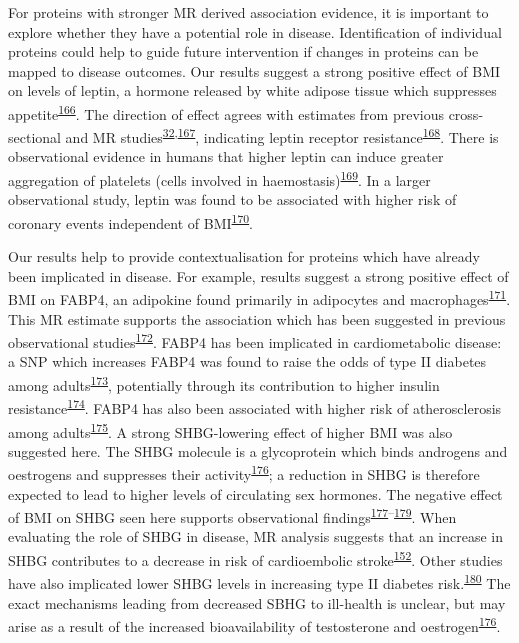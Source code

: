 \documentclass[11pt,twoside]{bristolthesis}
\begin{document}
For proteins with stronger MR derived association evidence, it is important to explore whether they have a potential role in disease. Identification of individual proteins could help to guide future intervention if changes in proteins can be mapped to disease outcomes. Our results suggest a strong positive effect of BMI on levels of leptin, a hormone released by white adipose tissue which suppresses appetite\textsuperscript{\protect\hyperlink{ref-Klok2007}{166}}. The direction of effect agrees with estimates from previous cross-sectional and MR studies\textsuperscript{\protect\hyperlink{ref-Wurtz2014}{32},\protect\hyperlink{ref-Millard2015}{167}}, indicating leptin receptor resistance\textsuperscript{\protect\hyperlink{ref-Gruzdeva2019a}{168}}. There is observational evidence in humans that higher leptin can induce greater aggregation of platelets (cells involved in haemostasis)\textsuperscript{\protect\hyperlink{ref-Nakata1999}{169}}. In a larger observational study, leptin was found to be associated with higher risk of coronary events independent of BMI\textsuperscript{\protect\hyperlink{ref-Wallace2001}{170}}.

Our results help to provide contextualisation for proteins which have already been implicated in disease. For example, results suggest a strong positive effect of BMI on FABP4, an adipokine found primarily in adipocytes and macrophages\textsuperscript{\protect\hyperlink{ref-Furuhashi2014}{171}}. This MR estimate supports the association which has been suggested in previous observational studies\textsuperscript{\protect\hyperlink{ref-Xu2006}{172}}. FABP4 has been implicated in cardiometabolic disease: a SNP which increases FABP4 was found to raise the odds of type II diabetes among adults\textsuperscript{\protect\hyperlink{ref-Gudmundsdottir2020}{173}}, potentially through its contribution to higher insulin resistance\textsuperscript{\protect\hyperlink{ref-Nakamura2017}{174}}. FABP4 has also been associated with higher risk of atherosclerosis among adults\textsuperscript{\protect\hyperlink{ref-Yeung2007}{175}}. A strong SHBG-lowering effect of higher BMI was also suggested here. The SHBG molecule is a glycoprotein which binds androgens and oestrogens and suppresses their activity\textsuperscript{\protect\hyperlink{ref-Wallace2013}{176}}; a reduction in SHBG is therefore expected to lead to higher levels of circulating sex hormones. The negative effect of BMI on SHBG seen here supports observational findings\textsuperscript{\protect\hyperlink{ref-Cooper2015}{177}--\protect\hyperlink{ref-Baglietto2009}{179}}. When evaluating the role of SHBG in disease, MR analysis suggests that an increase in SHBG contributes to a decrease in risk of cardioembolic stroke\textsuperscript{\protect\hyperlink{ref-Zheng2020}{152}}. Other studies have also implicated lower SHBG levels in increasing type II diabetes risk.\textsuperscript{\protect\hyperlink{ref-Ritchie2019}{180}} The exact mechanisms leading from decreased SBHG to ill-health is unclear, but may arise as a result of the increased bioavailability of testosterone and oestrogen\textsuperscript{\protect\hyperlink{ref-Wallace2013}{176}}.
\end{document}
